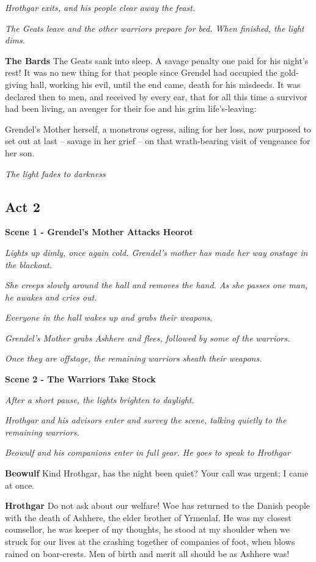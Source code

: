 \documentclass[a4paper]{article}
\begin{document}
{\centerline{\textit{Hrothgar exits, and his people clear away the feast.}}
\centerline{\textit{The Geats leave and the other warriors prepare for bed. When finished, the light dims.}}

\textbf{The Bards} The Geats sank into sleep. A savage penalty
one paid for his night's rest! It was no new thing for that people
since Grendel had occupied the gold-giving hall,
working his evil, until the end came,
death for his misdeeds. It was declared then to men,
and received by every ear, that for all this time
a survivor had been living, an avenger for their foe
and his grim life's-leaving:

Grendel's Mother herself,
a monstrous ogress, ailing for her loss,
now purposed to set out at last – savage in her grief –
on that wrath-bearing visit of vengeance for her son.

\centerline{\textit{The light fades to darkness}}

\subsection{Act 2}%

\centerline{\textbf{Scene 1 - Grendel's Mother Attacks Heorot}}
\centerline{\textit{Lights up dimly, once again cold. Grendel's mother has made her way onstage in the blackout.}}
\centerline{\textit{She creeps slowly around the hall and removes the hand. As she passes one man, he awakes and cries out.}}
\centerline{\textit{Everyone in the hall wakes up and grabs their weapons.}}
\centerline{\textit{Grendel's Mother grabs Ashhere and flees, followed by some of the warriors.}}
\centerline{\textit{Once they are offstage, the remaining warriors sheath their weapons.}}

\newpage
\centerline{\textbf{Scene 2 - The Warriors Take Stock}}
\centerline{\textit{After a short pause, the lights brighten to daylight.}}
\centerline{\textit{Hrothgar and his advisors enter and survey the scene, talking quietly to the remaining warriors.}}
\centerline{\textit{Beowulf and his companions enter in full gear. He goes to speak to Hrothgar}}

\textbf{Beowulf} Kind Hrothgar, has the night been quiet?
Your call was urgent; I came at once. 

\textbf{Hrothgar} Do not ask about our welfare! Woe has returned
to the Danish people with the death of Ashhere,
the elder brother of Yrmenlaf.
He was my closest counsellor, he was keeper of my thoughts,
he stood at my shoulder when we struck for our lives
at the crashing together of companies of foot,
when blows rained on boar-crests. Men of birth and merit
all should be as Ashhere was!

}
\end{document}

